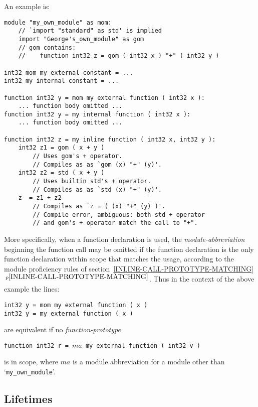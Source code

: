 \documentclass[12pt]{article}
\newcommand{\itemref}[1]{\ref{#1}$\,^{p\pageref{#1}}$}
\newenvironment{indpar}[1][0.3in]%
	{\begin{list}{}%
		     {\setlength{\itemsep}{0in}%
		      \setlength{\topsep}{0in}%
		      \setlength{\parsep}{1ex}%
		      \setlength{\labelwidth}{#1}%
		      \setlength{\leftmargin}{#1}%
		      \addtolength{\leftmargin}{\labelsep}}%
	 \item}%
	{\end{list}}
\begin{document}
An example is:
\begin{indpar}\begin{verbatim}
module "my_own_module" as mom:
    // `import "standard" as std' is implied
    import "George's_own_module" as gom
    // gom contains:
    //    function int32 z = gom ( int32 x ) "+" ( int32 y )

int32 mom my external constant = ...
int32 my internal constant = ...

function int32 y = mom my external function ( int32 x ):
    ... function body omitted ...
function int32 y = my internal function ( int32 x ):
    ... function body omitted ...

function int32 z = my inline function ( int32 x, int32 y ):
    int32 z1 = gom ( x + y )
        // Uses gom's + operator.
        // Compiles as as `gom (x) "+" (y)'.
    int32 z2 = std ( x + y )
        // Uses builtin std's + operator.
        // Compiles as as `std (x) "+" (y)'.
    z  = z1 + z2 
        // Compiles as `z = ( (x) "+" (y) )'.
        // Compile error, ambiguous: both std + operator
        // and gom's + operator match the call to "+".
\end{verbatim}\end{indpar}\label{EXTERNAL-INTERNAL-EXAMPLE}

More specifically,
when a function declaration is used, the {\em module-abbreviation}
beginning the function call may be omitted if the function declaration is
the only function declaration within scope that matches the usage,
according to the module proficiency rules of
section~\itemref{INLINE-CALL-PROTOTYPE-MATCHING}.
Thus in the context of the above example the lines:
\begin{indpar}\begin{verbatim}
int32 y = mom my external function ( x )
int32 y = my external function ( x )
\end{verbatim}\end{indpar}
are equivalent if no {\em function-prototype}
\begin{center}
\tt function int32 r = $ma$ my external function ( int32 v )
\end{center}
is in scope, where $ma$ is a module abbreviation for a module
other than `{\tt my\_own\_module}'.

\subsection{Lifetimes}
\label{LIFETIMES}
\end{document}
